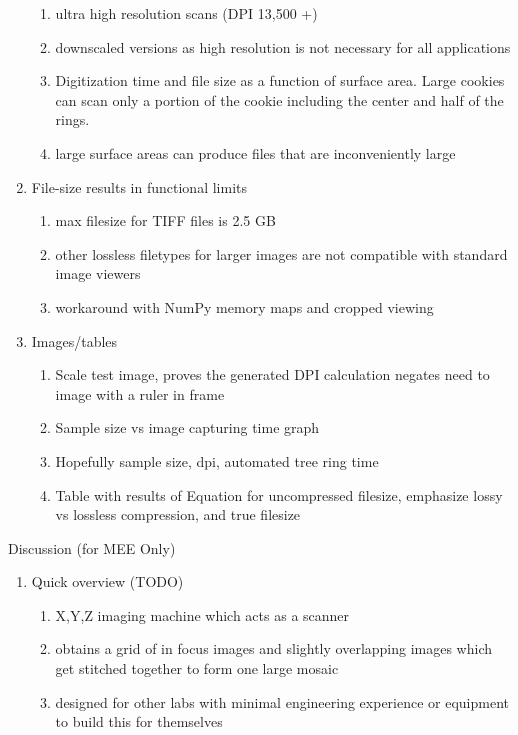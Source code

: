 \documentclass{article}
\begin{document}
\begin{outline}[enumerate]
\begin{enumerate}
\begin{enumerate}
		\item ultra high resolution scans (DPI 13,500 +)
		\item downscaled versions as high resolution is not necessary for all applications
		\item Digitization time and file size as a function of surface area. Large cookies can scan only a portion of the cookie including the center and half of the rings.
		\item large surface areas can produce files that are inconveniently large
		\end{enumerate}
	\item File-size results in functional limits 
		\begin{enumerate}
		\item max filesize for TIFF files is 2.5 GB
		\item other lossless filetypes for larger images are not compatible with standard image viewers
		\item workaround with NumPy memory maps and cropped viewing 
		\end{enumerate}
	\item Images/tables	
		\begin{enumerate}
		\item Scale test image, proves the generated DPI calculation negates need to image with a ruler in frame
		\item Sample size vs image capturing time graph
		\item Hopefully sample size, dpi, automated tree ring time
		\item Table with results of Equation for uncompressed filesize, emphasize lossy vs lossless compression, and true filesize %
		\end{enumerate}
	\end{enumerate}
\item Discussion (for MEE Only) 
	\begin{enumerate}
	\item Quick overview (TODO)
		\begin{enumerate}
		\item X,Y,Z imaging machine which acts as a scanner 
		\item obtains a grid of in focus images and slightly overlapping images which get stitched together to form one large mosaic 
		\item designed for other labs with minimal engineering experience or equipment to build this for themselves

\end{enumerate}
\end{enumerate}
\end{outline}
\end{document}
